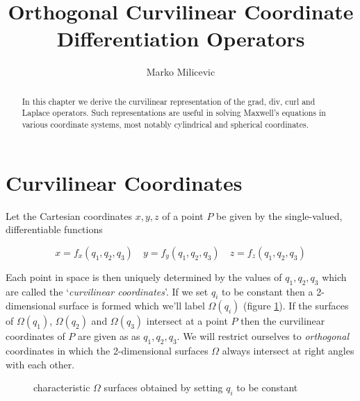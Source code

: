 \documentclass[twoside, a4paper]{article}
\title{Orthogonal Curvilinear Coordinate Differentiation Operators}
\author{Marko Milicevic}
\date{}	%
\begin{document}
\maketitle

\begin{abstract}

In this chapter we derive the curvilinear representation of the grad, div, curl and Laplace operators. Such representations are useful in solving Maxwell's equations in various coordinate systems, most notably cylindrical and spherical coordinates.

\end{abstract}

\section{Curvilinear Coordinates}
Let the Cartesian coordinates $x,y,z$ of a point $P$ be given by the single-valued, differentiable functions

\begin{equation*}
x=f_x(q_1,q_2,q_3) \quad y=f_y(q_1,q_2,q_3) \quad z=f_z(q_1,q_2,q_3)
\end{equation*}

Each point in space is then uniquely determined by the values of $q_1, q_2,q_3$ which are called the `\textit{curvilinear coordinates}'.
If we set $q_i$ to be constant then a 2-dimensional surface is formed which we'll label $\Omega(q_i)$ (figure \ref{fig:q_surfaces}). If the surfaces of $\Omega(q_1)$, $\Omega(q_2)$ and $\Omega(q_3)$ intersect at a point $P$ then the curvilinear coordinates of $P$ are given as as $q_1, q_2, q_3$. We will restrict ourselves to \textit{orthogonal} coordinates in which  the 2-dimensional surfaces $\Omega$ always intersect at right angles with each other.\\

\begin{figure}[htbp]
	\centering
	\caption{characteristic $\Omega$ surfaces obtained by setting $q_i$ to be constant}
	\label{fig:q_surfaces}
\end{figure}
\end{document}
